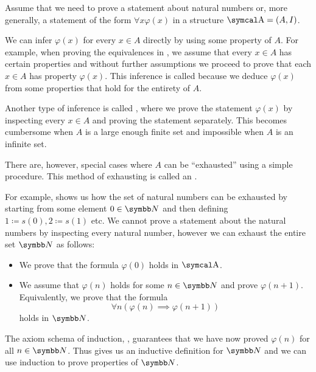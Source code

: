 \begin{remark}\label{remark:induction}
  Assume that we need to prove a statement about natural numbers or, more generally, a statement of the form \( \forall x \varphi(x) \) in a structure \( \CA = (A, I) \).

  We can infer \( \varphi(x) \) for every \( x \in A \) directly by using some property of \( A \). For example, when proving the equivalences in , we assume that every \( x \in A \) has certain properties and without further assumptions we proceed to prove that each \( x \in A \) has property \( \varphi(x) \). This inference is called  because we deduce \( \varphi(x) \) from some properties that hold for the entirety of \( A \).

  Another type of inference is called , where we prove the statement \( \varphi(x) \) by inspecting every \( x \in A \) and proving the statement separately. This becomes cumbersome when \( A \) is a large enough finite set and impossible when \( A \) is an infinite set.

  There are, however, special cases where \( A \) can be \enquote{exhausted} using a simple procedure. This method of exhausting is called an .

  For example,  shows us how the set of natural numbers can be exhausted by starting from some element \( 0 \in \BN \) and then defining \( 1 \coloneqq s(0), 2 \coloneqq s(1) \) etc. We cannot prove a statement about the natural numbers by inspecting every natural number, however we can exhaust the entire set \( \BN \) as follows:
  \begin{itemize}
    \item We prove that the formula \( \varphi(0) \) holds in \( \CA \).
    \item We assume that \( \varphi(n) \) holds for some \( n \in \BN \) and prove \( \varphi(n + 1) \). Equivalently, we prove that the formula
    \begin{equation*}
      \forall n (\varphi(n) \implies \varphi(n + 1))
    \end{equation*}
    holds in \( \BN \).
  \end{itemize}

  The axiom schema of induction, , guarantees that we have now proved \( \varphi(n) \) for all \( n \in \BN \). Thus  gives us an inductive definition for \( \BN \) and we can use induction to prove properties of \( \BN \).


\end{remark}
